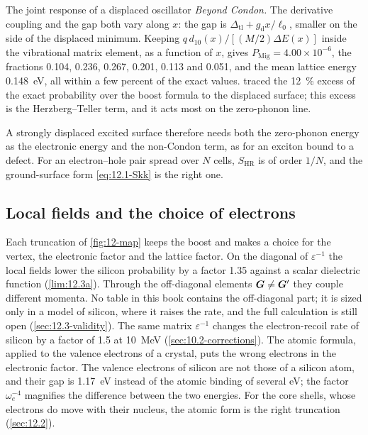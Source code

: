 \begin{workedexample}{The joint response of a displaced oscillator}
\emph{Beyond Condon.} The derivative coupling and the gap both vary along $x$: the gap is $\Delta_{\mathrm{tl}} + g_{\mathrm{d}}x/\ell_0$, smaller on the side of the displaced minimum. Keeping $q\,d_{10}(x)/[(M/2)\Delta E(x)]$ inside the vibrational matrix element, as a function of $x$, gives $P_{\mathrm{Mig}} = 4.00\times10^{-6}$, the fractions 0.104, 0.236, 0.267, 0.201, 0.113 and 0.051, and the mean lattice energy \SI{0.148}{eV}, all within a few percent of the exact values.  traced the \SI{12}{\percent} excess of the exact probability over the boost formula to the displaced surface; this excess is the Herzberg--Teller term, and it acts most on the zero-phonon line.

A strongly displaced excited surface therefore needs both the zero-phonon energy as the electronic energy and the non-Condon term, as for an exciton bound to a defect. For an electron--hole pair spread over $N$ cells, $S_{\mathrm{HR}}$ is of order $1/N$, and the ground-surface form \cref{eq:12.1-Skk} is the right one.
\end{workedexample}

\subsection{Local fields and the choice of electrons}\label{sec:12.1-truncations}

Each truncation of \cref{fig:12-map} keeps the boost and makes a choice for the vertex, the electronic factor and the lattice factor. On the diagonal of $\varepsilon^{-1}$ the local fields lower the silicon probability by a factor 1.35 against a scalar dielectric function (\cref{lim:12.3a}). Through the off-diagonal elements $\bm{G} \neq \bm{G}'$ they couple different momenta. No table in this book contains the off-diagonal part; it is sized only in a model of silicon, where it raises the rate, and the full calculation is still open (\cref{sec:12.3-validity}). The same matrix $\varepsilon^{-1}$ changes the electron-recoil rate of silicon by a factor of 1.5 at \SI{10}{MeV} (\cref{sec:10.2-corrections}). The atomic formula, applied to the valence electrons of a crystal, puts the wrong electrons in the electronic factor. The valence electrons of silicon are not those of a silicon atom, and their gap is \SI{1.17}{eV} instead of the atomic binding of several eV; the factor $\omega_e^{-4}$ magnifies the difference between the two energies. For the core shells, whose electrons do move with their nucleus, the atomic form is the right truncation (\cref{sec:12.2}).

